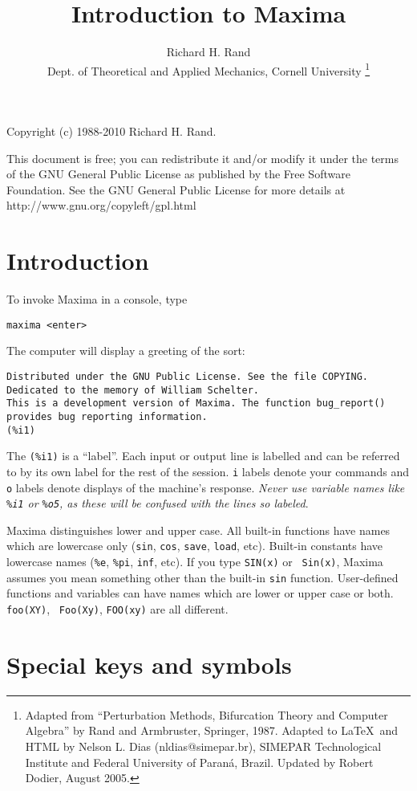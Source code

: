 \documentclass[a4paper,12pt]{article}
\title{Introduction to Maxima}
\author{Richard H. Rand\\
Dept. of Theoretical and Applied Mechanics, Cornell University
\thanks{Adapted from ``Perturbation Methods, Bifurcation Theory and Computer Algebra''
by Rand and Armbruster, Springer, 1987.
Adapted to \LaTeX\ and HTML by Nelson L. Dias (nldias@simepar.br), 
SIMEPAR Technological Institute and Federal University of Paraná, Brazil.
Updated by Robert Dodier, August 2005.}}
\date{\empty}
\begin{document}
\maketitle

\noindent
Copyright (c) 1988-2010 Richard H. Rand.

\noindent
This document is free; you can redistribute it and/or modify it under
the terms of the GNU General Public License as published by the Free
Software Foundation. See the GNU General Public License for more
details at http://www.gnu.org/copyleft/gpl.html

\tableofcontents

\newpage
\section{Introduction \label{sec:introduction}}

To invoke Maxima in a console, type
\begin{verbatim}
maxima <enter>
\end{verbatim}


The computer will display a greeting of the sort:
\begin{verbatim}
Distributed under the GNU Public License. See the file COPYING.
Dedicated to the memory of William Schelter.
This is a development version of Maxima. The function bug_report()
provides bug reporting information.
(%i1)
\end{verbatim}

The {\tt (\%i1)} is a ``label''.  Each input or output line is
labelled and can be referred to by its own label for the rest of the
session.  {\tt i} labels denote your commands and {\tt o} labels
denote displays of the machine's response.  \emph{Never use variable
  names like {\tt \%i1} or {\tt \%o5}, as these will be confused with
  the lines so labeled}.

Maxima distinguishes lower and upper case.  All built-in functions
have names which are lowercase only ({\tt sin}, {\tt cos}, {\tt save},
{\tt load}, etc).  Built-in constants have lowercase names ({\tt \%e},
{\tt \%pi}, {\tt inf}, etc).  If you type {\tt SIN(x)} or {\tt
  Sin(x)}, Maxima assumes you mean something other than the built-in
{\tt sin} function.  User-defined functions and variables can have
names which are lower or upper case or both.  {\tt foo(XY)}, {\tt
  Foo(Xy)}, {\tt FOO(xy)} are all different.


\section{Special keys and symbols \label{sec:keys}}
\end{document}
